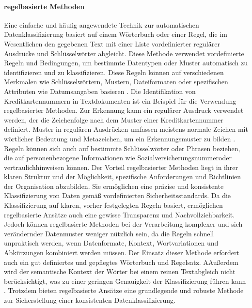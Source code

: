 \paragraph{regelbasierte Methoden}
Eine einfache und häufig angewendete Technik zur automatischen Datenklassifizierung basiert auf einem Wörterbuch oder einer Regel, die im Wesentlichen den gegebenen Text mit einer Liste vordefinierter regulärer Ausdrücke und Schlüsselwörter abgleicht. Diese Methode verwendet vordefinierte Regeln und Bedingungen, um bestimmte Datentypen oder Muster automatisch zu identifizieren und zu klassifizieren. Diese Regeln können auf verschiedenen Merkmalen wie Schlüsselwörtern, Mustern, Dateiformaten oder spezifischen Attributen wie Datumsangaben basieren \cite{Ong.2017}.
Die Identifikation von Kreditkartennummern in Textdokumenten ist ein Beispiel für die Verwendung regelbasierter Methoden. Zur Erkennung kann ein regulärer Ausdruck verwendet werden, der die Zeichenfolge nach dem Muster einer Kreditkartennummer definiert. Muster in regulären Ausdrücken umfassen meistens normale Zeichen mit wörtlicher Bedeutung und Metazeichen, um ein Erkennungsmuster zu bilden \cite{Alneyadi.2016}.
Regeln können sich auch auf bestimmte Schlüsselwörter oder Phrasen beziehen, die auf personenbezogene Informationen wie \glqq Sozialversicherungsnummer\grqq \:oder \glqq vertraulich\grqq \:hinweisen können.
Der Vorteil regelbasierter Methoden liegt in ihrer klaren Struktur und der Möglichkeit, spezifische Anforderungen und Richtlinien der Organisation abzubilden. Sie ermöglichen eine präzise und konsistente Klassifizierung von Daten gemäß vordefinierten Sicherheitsstandards. Da die Klassifizierung auf klaren, vorher festgelegten Regeln basiert, ermöglichen regelbasierte Ansätze auch eine gewisse Transparenz und Nachvollziehbarkeit.
Jedoch können regelbasierte Methoden bei der Verarbeitung komplexer und sich verändernder Datenmuster weniger nützlich sein, da die Regeln schnell unpraktisch werden, wenn Datenformate, Kontext, Wortvariationen und Abkürzungen kombiniert werden müssen. Der Einsatz dieser Methode erfordert auch ein gut definiertes und gepflegtes Wörterbuch und Regelsatz. AAußerdem wird der semantische Kontext der Wörter bei einem reinen Textabgleich nicht berücksichtigt, was zu einer geringen Genauigkeit der Klassifizierung führen kann \cite{Ong.2017}.
Trotzdem bieten regelbasierte Ansätze eine grundlegende und robuste Methode zur Sicherstellung einer konsistenten Datenklassifizierung.

